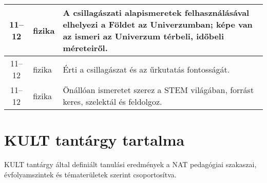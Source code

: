 \begin{small}
\begin{longtable}{c | p{2cm} |  p{11cm} }
              11--12 & fizika & A csillagászati alapismeretek felhasználásával elhelyezi a Földet az Univerzumban; képe van az ismeri az Univerzum térbeli, időbeli méreteiről. \\ \hline
              11--12 & fizika & Érti a csillagászat és az űrkutatás fontosságát. \\ \hline
              11--12 & fizika & Önállóan ismeretet szerez a STEM világában, forrást keres, szelektál és feldolgoz. \\ \hline
      \end{longtable}
\end{small}




\section{KULT tantárgy tartalma }
KULT tantárgy által definiált tanulási eredmények a NAT pedagógiai szakaszai, évfolyamszintek és tématerületek szerint csoportosítva.

